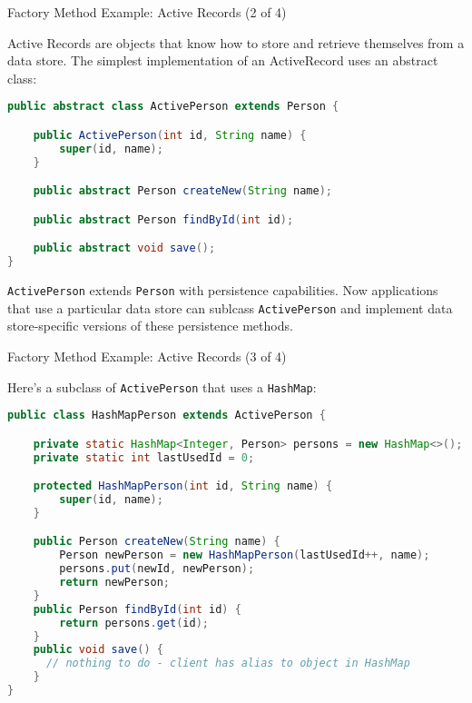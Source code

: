 \documentclass{beamer}
\begin{document}
\begin{frame}[fragile]{Factory Method Example: Active Records (2 of 4)}


Active Records are objects that  know how to store and retrieve themselves from a data store.  The simplest implementation of an ActiveRecord uses an abstract class:
\begin{lstlisting}[language=Java]
public abstract class ActivePerson extends Person {

    public ActivePerson(int id, String name) {
        super(id, name);
    }

    public abstract Person createNew(String name);

    public abstract Person findById(int id);

    public abstract void save();
}
\end{lstlisting}
\vspace{-.05in}
{\tt ActivePerson} extends {\tt Person} with persistence capabilities.  Now applications that use a particular data store can sublcass {\tt ActivePerson} and implement data store-specific versions of these persistence methods.


\end{frame}

\begin{frame}[fragile]{Factory Method Example: Active Records (3 of 4)}


Here's a subclass of {\tt ActivePerson} that uses a {\tt HashMap}:
\vspace{-.05in}
\begin{lstlisting}[language=Java]
public class HashMapPerson extends ActivePerson {

    private static HashMap<Integer, Person> persons = new HashMap<>();
    private static int lastUsedId = 0;

    protected HashMapPerson(int id, String name) {
        super(id, name);
    }

    public Person createNew(String name) {
        Person newPerson = new HashMapPerson(lastUsedId++, name);
        persons.put(newId, newPerson);
        return newPerson;
    }
    public Person findById(int id) {
        return persons.get(id);
    }
    public void save() {
      // nothing to do - client has alias to object in HashMap
    }    
}
\end{lstlisting}

\end{frame}
\end{document}
